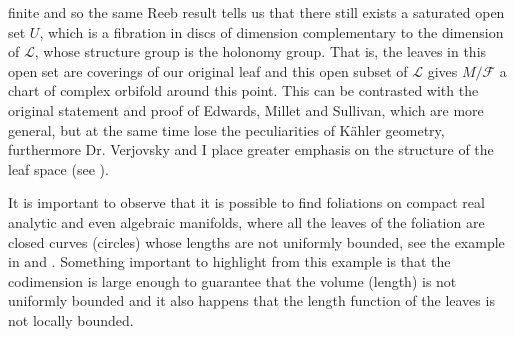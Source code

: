 \documentclass[12pt,twoside,a4paper]{report}
\begin{document}
finite and so the same Reeb result tells us that there still exists a saturated open set $U$, which is a fibration in
discs of dimension complementary to the dimension of $\mathcal{L}$, whose structure group is the holonomy group.
That is, the leaves in this open set are coverings of our original leaf and this open subset of $\mathcal{L}$ gives $M/\mathcal{F}$
a chart of complex orbifold around this point.
This can be contrasted with the original statement and proof of Edwards, Millet and Sullivan, which are more general, but at the same time lose
the peculiarities of Kähler geometry, furthermore Dr. Verjovsky and I place greater emphasis on the structure of the
leaf space (see \cite{EMS}).

It is important to observe that it is possible to find foliations on compact real analytic and even algebraic manifolds, where
all the leaves of the foliation are closed curves (circles) whose lengths are not uniformly bounded, see the example in \cite{E-V} and \cite{Epstein2}.
Something important to highlight from this example is that the codimension is large enough
to guarantee that the volume (length) is not uniformly bounded and it also happens that the length function of the leaves
is not locally bounded.
\end{document}

